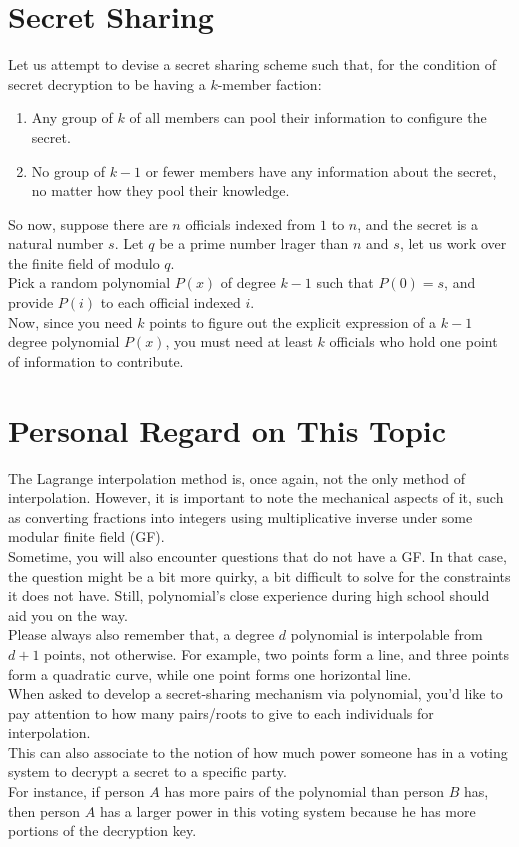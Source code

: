 \section{Secret Sharing}
Let us attempt to devise a secret sharing scheme such that, for the condition of secret decryption to be having a $k$-member faction:
\begin{enumerate}
    \item Any group of $k$ of all members can pool their information to configure the secret.
    \item No group of $k - 1$ or fewer members have any information about the secret, no matter how they pool their knowledge.
\end{enumerate}
So now, suppose there are $n$ officials indexed from $1$ to $n$, and the secret is a natural number $s$. Let $q$ be a prime number lrager than $n$ and $s$, let us work over the finite field of modulo $q$. \\
Pick a random polynomial $P(x)$ of degree $k - 1$ such that $P(0) = s$, and provide $P(i)$ to each official indexed $i$. \\
Now, since you need $k$ points to figure out the explicit expression of a $k - 1$ degree polynomial $P(x)$, you must need at least $k$ officials who hold one point of information to contribute.

\section{Personal Regard on This Topic}
The Lagrange interpolation method is, once again, not the only method of interpolation. However, it is important to note the mechanical aspects of it, such as converting fractions into integers using multiplicative inverse under some modular finite field (GF). \\
Sometime, you will also encounter questions that do not have a GF. In that case, the question might be a bit more quirky, a bit difficult to solve for the constraints it does not have. Still, polynomial's close experience during high school should aid you on the way. \\

Please always also remember that, a degree $d$ polynomial is interpolable from $d + 1$ points, not otherwise. For example, two points form a line, and three points form a quadratic curve, while one point forms one horizontal line. \\

When asked to develop a secret-sharing mechanism via polynomial, you'd like to pay attention to how many pairs/roots to give to each individuals for interpolation. \\
This can also associate to the notion of how much power someone has in a voting system to decrypt a secret to a specific party. \\
For instance, if person $A$ has more pairs of the polynomial than person $B$ has, then person $A$ has a larger power in this voting system because he has more portions of the decryption key.
